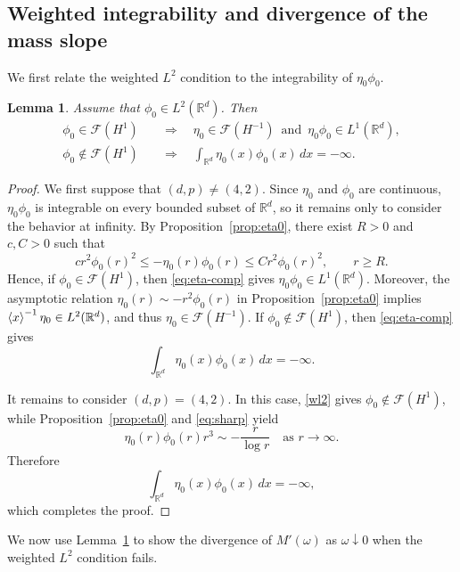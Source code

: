 \documentclass[12pt, a4paper, reqno]{amsart}
\numberwithin{equation}{section}
\newtheorem{lemma}[theorem]{Lemma}
\theoremstyle{definition}
\theoremstyle{remark}
\newcommand{\R}{\mathbb R}
\newcommand{\cF}{\mathcal F}
\begin{document}

\subsection{Weighted integrability and divergence of the mass slope}

We first relate the weighted $L^2$ condition to
the integrability of $\eta_0\phi_0$.

\begin{lemma}\label{lem:eta-pair}
Assume that $\phi_0\in L^2(\R^d)$. Then
\begin{align*}
  \phi_0\in\cF(H^1)
  &\quad\Longrightarrow\quad
  \eta_0\in\cF(H^{-1})\enspace\text{and}\enspace\eta_0\phi_0\in L^1(\R^d),
  \\
  \phi_0\notin\cF(H^1)
  &\quad\Longrightarrow\quad
  \int_{\R^d}\eta_0(x)\phi_0(x)\,dx=-\infty.
\end{align*}
\end{lemma}

\begin{proof}
We first suppose that $(d,p)\ne(4,2)$. Since $\eta_0$ and $\phi_0$
are continuous, $\eta_0\phi_0$ is integrable on every bounded subset
of $\R^d$, so it remains only to consider the behavior at infinity.
By Proposition~\ref{prop:eta0}, there exist $R>0$ and $c,C>0$ such that
\begin{equation}\label{eq:eta-comp}
  c r^2\phi_0(r)^2
  \le -\eta_0(r)\phi_0(r)
  \le C r^2\phi_0(r)^2,
  \qquad r\ge R.
\end{equation}
Hence, if $\phi_0\in\cF(H^1)$, then
\eqref{eq:eta-comp} gives $\eta_0\phi_0\in L^1(\R^d)$.
Moreover, the asymptotic relation
$\eta_0(r)\sim-r^2\phi_0(r)$ in Proposition~\ref{prop:eta0}
implies $\braket{x}^{-1}\eta_0\in L^2(\R^d)$, and thus
$\eta_0\in\cF(H^{-1})$.
If $\phi_0\notin\cF(H^1)$, then \eqref{eq:eta-comp} gives
\[
  \int_{\R^d}\eta_0(x)\phi_0(x)\,dx=-\infty.
\]

It remains to consider $(d,p)=(4,2)$. In this case,
\eqref{wl2} gives $\phi_0\notin\cF(H^1)$, while
Proposition~\ref{prop:eta0} and \eqref{eq:sharp} yield
\[
  \eta_0(r)\phi_0(r)r^3
  \sim-\frac{r}{\log r}
  \quad\text{as }r\to\infty.
\]
Therefore
\[
  \int_{\R^d}\eta_0(x)\phi_0(x)\,dx=-\infty,
\]
which completes the proof.
\end{proof}

We now use Lemma~\ref{lem:eta-pair} to show the divergence of $M'(\omega)$ as $\omega\downarrow0$ when the weighted $L^2$ condition fails.
\end{document}
